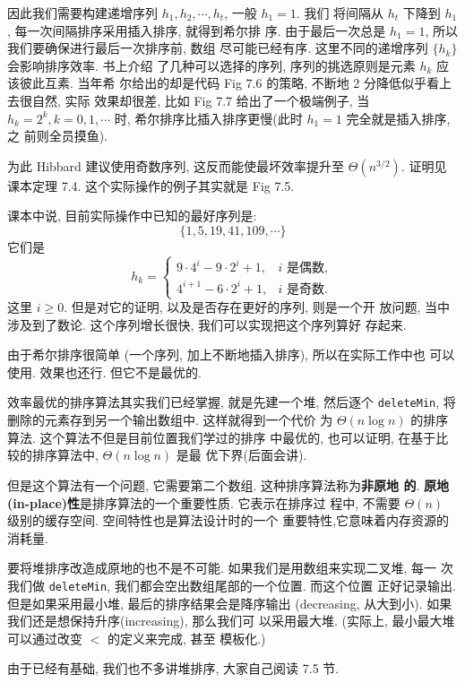\documentclass[a4paper]{ctexart}
\theoremstyle{definition}
\theoremstyle{definition}
\begin{document}
因此我们需要构建递增序列 $h_1, h_2, \cdots, h_t$, 一般 $h_1 = 1$. 我们
将间隔从 $h_t$ 下降到 $h_1$, 每一次间隔排序采用插入排序, 就得到希尔排
序. 由于最后一次总是 $h_1 = 1$, 所以我们要确保进行最后一次排序前, 数组
尽可能已经有序. 这里不同的递增序列 $\{h_k\}$ 会影响排序效率. 书上介绍
了几种可以选择的序列, 序列的挑选原则是元素 $h_k$ 应该彼此互素. 当年希
尔给出的却是代码 Fig 7.6 的策略, 不断地 2 分降低似乎看上去很自然, 实际
效果却很差, 比如 Fig 7.7 给出了一个极端例子, 当 $h_k = 2^k, k = 0, 1,
\cdots$ 时, 希尔排序比插入排序更慢(此时 $h_1 = 1$ 完全就是插入排序, 之
前则全员摸鱼).

为此 Hibbard 建议使用奇数序列, 这反而能使最坏效率提升至 $\Theta(n^{3 /
  2})$. 证明见课本定理 7.4. 这个实际操作的例子其实就是 Fig 7.5.

课本中说, 目前实际操作中已知的最好序列是:
$$
\{1, 5, 19, 41, 109, \cdots\}
$$
它们是
$$
h_k = \left\{
\begin{array}{ll}
  9 \cdot 4^i - 9 \cdot 2^i + 1, & \mbox{$i$ 是偶数},\\
  4^{i + 1} - 6 \cdot 2^i + 1, & \mbox{$i$ 是奇数}.
\end{array}
\right.
$$
这里 $i \geq 0$. 但是对它的证明, 以及是否存在更好的序列, 则是一个开
放问题, 当中涉及到了数论. 这个序列增长很快, 我们可以实现把这个序列算好
存起来.

由于希尔排序很简单 (一个序列, 加上不断地插入排序), 所以在实际工作中也
可以使用. 效果也还行. 但它不是最优的.


效率最优的排序算法其实我们已经掌握, 就是先建一个堆, 然后逐个
\verb|deleteMin|, 将删除的元素存到另一个输出数组中. 这样就得到一个代价
为 $\Theta(n \log n)$ 的排序算法. 这个算法不但是目前位置我们学过的排序
中最优的, 也可以证明, 在基于比较的排序算法中, $\Theta(n \log n)$ 是最
优下界(后面会讲).

但是这个算法有一个问题, 它需要第二个数组. 这种排序算法称为{\bf 非原地
  的}. {\bf 原地(in-place)性}是排序算法的一个重要性质. 它表示在排序过
程中, 不需要 $\Theta(n)$ 级别的缓存空间. 空间特性也是算法设计时的一个
重要特性,它意味着内存资源的消耗量.

要将堆排序改造成原地的也不是不可能. 如果我们是用数组来实现二叉堆, 每一
次我们做 \verb|deleteMin|, 我们都会空出数组尾部的一个位置. 而这个位置
正好记录输出. 但是如果采用最小堆, 最后的排序结果会是降序输出
(decreasing, 从大到小). 如果我们还是想保持升序(increasing), 那么我们可
以采用最大堆.  (实际上, 最小最大堆可以通过改变 $<$ 的定义来完成, 甚至
模板化.)

由于已经有基础, 我们也不多讲堆排序, 大家自己阅读 7.5 节.
\end{document}
